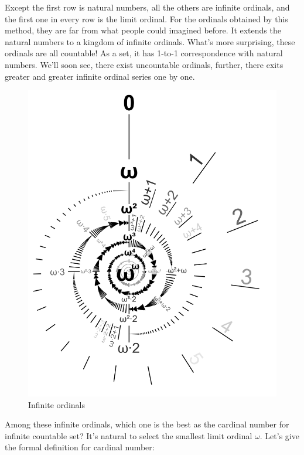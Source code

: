 \documentclass{article}
\begin{document}
Except the first row is natural numbers, all the others are infinite ordinals, and the first one in every row is the limit ordinal. For the ordinals obtained by this method, they are far from what people could imagined before. It extends the natural numbers to a kingdom of infinite ordinals. What's more surprising, these ordinals are all countable! As a set, it has 1-to-1 correspondence with natural numbers. We'll soon see, there exist uncountable ordinals, further, there exits greater and greater infinite ordinal series one by one.

\begin{figure}[htbp]
 \centering
 \includegraphics[scale=0.3]{img/Omega-exp-omega}
 \caption{Infinite ordinals}
 \label{fig:infinite-ordinals}
\end{figure}

Among these infinite ordinals, which one is the best as the cardinal number for infinite countable set? It's natural to select the smallest limit ordinal $\omega$. Let's give the formal definition for cardinal number:
\end{document}
